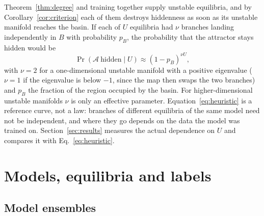 \documentclass[aip,cha,reprint,amsmath,amssymb,longbibliography]{revtex4-2}
\theoremstyle{definition}
\begin{document}
Theorem~\ref{thm:degree} and training together supply unstable equilibria, and by Corollary~\ref{cor:criterion} each of them
destroys hiddenness as soon as its unstable manifold reaches the basin. If each of $U$ equilibria had $\nu$ branches
landing independently in $B$ with probability $p_B$, the probability that the attractor stays hidden would be
\begin{equation}
\Pr(\mathcal{A}\ \text{hidden}\mid U)\approx(1-p_B)^{\nu U},
\label{eq:heuristic}
\end{equation}
with $\nu=2$ for a one-dimensional unstable manifold with a positive eigenvalue ($\nu=1$ if the eigenvalue is below $-1$,
since the map then swaps the two branches) and $p_B$ the fraction of the region occupied by the basin. For
higher-dimensional unstable manifolds $\nu$ is only an effective parameter. Equation~\eqref{eq:heuristic} is a reference curve, not a law:
branches of different equilibria of the same model need not be independent, and where they go depends on the data the
model was trained on. Section~\ref{sec:results} measures the actual dependence on $U$ and compares it with
Eq.~\eqref{eq:heuristic}.

\section{Models, equilibria and labels}
\label{sec:methods}

\subsection{Model ensembles}
\label{sec:ensembles}
\end{document}
